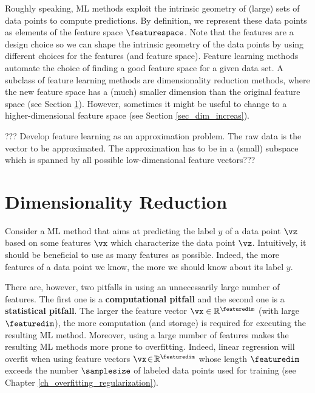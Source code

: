 \documentclass[12pt]{report}
\begin{document}


Roughly speaking, ML methods exploit the intrinsic geometry of (large) sets of 
data points to compute predictions. By definition, we represent these data points 
as elements of the feature space $\featurespace$. Note that the features are 
a design choice so we can shape the intrinsic geometry of the data points by 
using different choices for the features (and feature space). Feature learning 
methods automate the choice of finding a good feature space for a given 
data set. A subclass of feature learning methods are dimensionality reduction methods, 
where the new feature space has a (much) smaller dimension than the original 
feature space (see Section \ref{sec_dim_red}). However, sometimes it might be 
useful to change to a higher-dimensional feature space (see Section \ref{sec_dim_increas}). 


??? Develop feature learning as an approximation problem. The raw data is the vector to be approximated. 
The approximation has to be in a (small) subspace which is spanned by all possible low-dimensional feature vectors???

\section{Dimensionality Reduction} 
\label{sec_dim_red}

Consider a ML method that aims at predicting the label $y$  of a data point $\vz$ 
based on some features $\vx$ which characterize the data point $\vz$. Intuitively, it 
should be beneficial to use as many features as possible. Indeed, the more features 
of a data point we know, the more we should know about its label $y$. 

There are, however, two pitfalls in using an unnecessarily large number of features. 
The first one is a {\bf computational pitfall} and the second one is a {\bf statistical pitfall}. 
The larger the feature vector $\vx \in \mathbb{R}^{\featuredim}$ (with large $\featuredim$), 
the more computation (and storage) is required for executing the resulting ML method. 
Moreover, using a large number of features makes the resulting ML methods more prone to 
overfitting. Indeed, linear regression will overfit when using feature vectors $\vx\!\in\!\mathbb{R}^{\featuredim}$ 
whose length $\featuredim$ exceeds the number $\samplesize$ of labeled data points used 
for training (see Chapter \ref{ch_overfitting_regularization}). 
\end{document}
